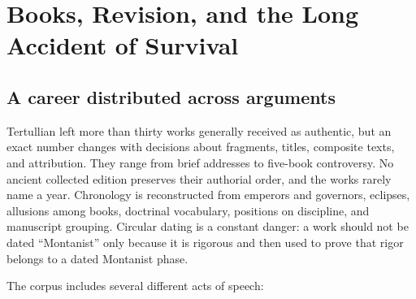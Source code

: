 \section{Books, Revision, and the Long Accident of Survival}

\subsection{A career distributed across arguments}

Tertullian left more than thirty works generally received as authentic, but an
exact number changes with decisions about fragments, titles, composite texts,
and attribution. They range from brief addresses to five-book controversy. No
ancient collected edition preserves their authorial order, and the works rarely
name a year. Chronology is reconstructed from emperors and governors, eclipses,
allusions among books, doctrinal vocabulary, positions on discipline, and
manuscript grouping. Circular dating is a constant danger: a work should not be
dated ``Montanist'' only because it is rigorous and then used to prove that
rigor belongs to a dated Montanist phase.

The corpus includes several different acts of speech:

